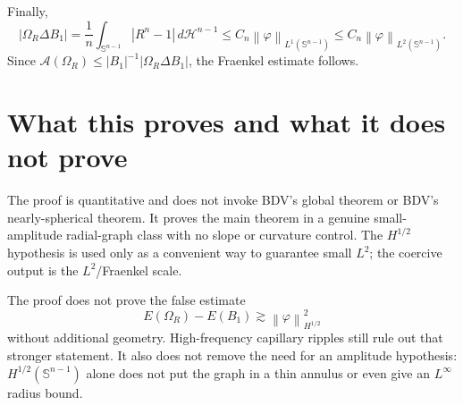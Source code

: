 \documentclass[11pt]{article}
\newcommand{\Sph}{\mathbb S^{n-1}}
\newcommand{\Om}{\Omega}
\newcommand{\cA}{\mathcal A}
\newcommand{\dH}{\,d\mathcal H^{n-1}}
\newcommand{\norm}[1]{\left\|#1\right\|}
\begin{document}
Finally,
\[
   |\Om_R\Delta B_1|
      =\frac1n\int_{\Sph}|R^n-1|\dH
      \le C_n\norm{\varphi}_{L^1(\Sph)}
      \le C_n\norm{\varphi}_{L^2(\Sph)}.
\]
Since \(\cA(\Om_R)\le |B_1|^{-1}|\Om_R\Delta B_1|\), the Fraenkel
estimate follows.

\section{What this proves and what it does not prove}

The proof is quantitative and does not invoke BDV's global theorem or
BDV's nearly-spherical theorem.  It proves the main theorem in a genuine
small-amplitude radial-graph class with no slope or curvature control.
The \(H^{1/2}\) hypothesis is used only as a convenient way to guarantee
small \(L^2\); the coercive output is the \(L^2\)/Fraenkel scale.

The proof does not prove the false estimate
\[
   E(\Om_R)-E(B_1)\gtrsim\norm{\varphi}_{H^{1/2}}^2
\]
without additional geometry.  High-frequency capillary ripples still rule
out that stronger statement.  It also does not remove the need for an
amplitude hypothesis: \(H^{1/2}(\Sph)\) alone does not put the graph in a
thin annulus or even give an \(L^\infty\) radius bound.
\end{document}
